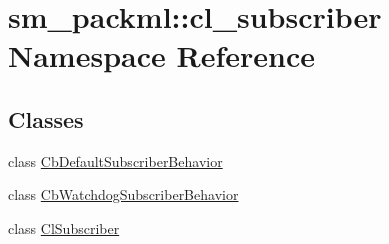 \hypertarget{namespacesm__packml_1_1cl__subscriber}{}\section{sm\+\_\+packml\+:\+:cl\+\_\+subscriber Namespace Reference}
\label{namespacesm__packml_1_1cl__subscriber}
\subsection*{Classes}
\begin{DoxyCompactItemize}
\item 
class \hyperlink{classsm__packml_1_1cl__subscriber_1_1CbDefaultSubscriberBehavior}{Cb\+Default\+Subscriber\+Behavior}
\item 
class \hyperlink{classsm__packml_1_1cl__subscriber_1_1CbWatchdogSubscriberBehavior}{Cb\+Watchdog\+Subscriber\+Behavior}
\item 
class \hyperlink{classsm__packml_1_1cl__subscriber_1_1ClSubscriber}{Cl\+Subscriber}
\end{DoxyCompactItemize}
